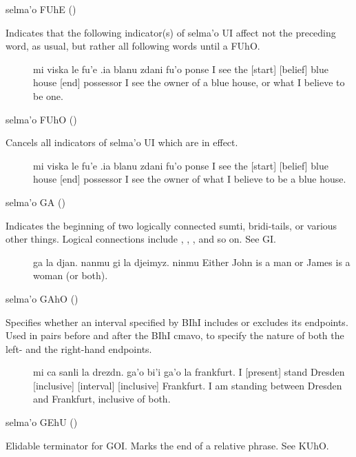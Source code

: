 selma'o FUhE () 

Indicates that the following indicator(s) of selma'o UI
    affect not the preceding word, as usual, but rather all
    following words until a FUhO.
\begin{description}
\item[] mi viska le fu'e .ia blanu zdani fu'o ponse I see the [start] [belief] blue house [end] possessor I see the owner of a blue house, or what I believe to be one.
\end{description}

selma'o FUhO () 

Cancels all indicators of selma'o UI which are in
    effect.
\begin{description}
\item[] mi viska le fu'e .ia blanu zdani fu'o ponse I see the [start] [belief] blue house [end] possessor I see the owner of what I believe to be a blue house.
\end{description}

selma'o GA () 

Indicates the beginning of two logically connected sumti,
    bridi-tails, or various other things. Logical connections
    include , , ,
    and so on. See GI.
\begin{description}
\item[] ga la djan. nanmu gi la djeimyz. ninmu Either John is a man or James is a woman (or both).
\end{description}

selma'o GAhO () 

Specifies whether an interval specified by BIhI includes or
    excludes its endpoints. Used in pairs before and after the BIhI
    cmavo, to specify the nature of both the left- and the
    right-hand endpoints.
\begin{description}
\item[] mi ca sanli la drezdn. ga'o bi'i ga'o la frankfurt. I [present] stand Dresden [inclusive] [interval] [inclusive] Frankfurt. I am standing between Dresden and Frankfurt, inclusive of both.
\end{description}

selma'o GEhU () 

Elidable terminator for GOI. Marks the end of a relative
    phrase. See KUhO.


